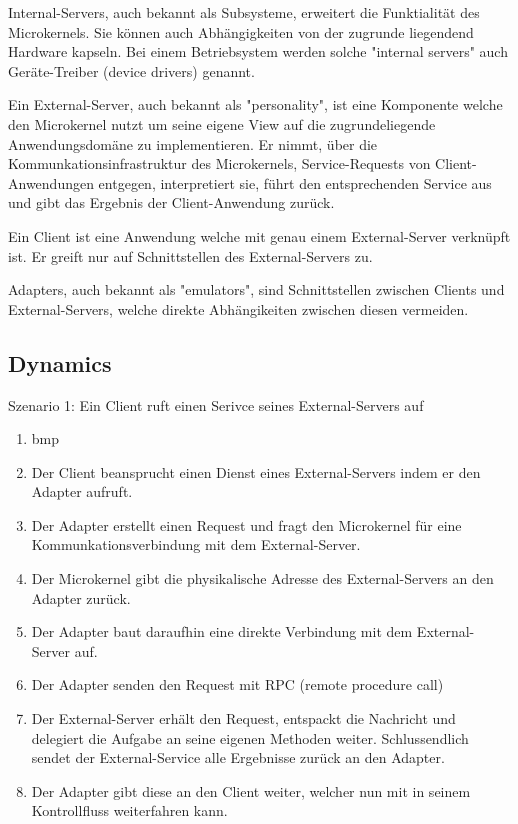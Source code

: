 Internal-Servers, auch bekannt als Subsysteme, erweitert die Funktialität des Microkernels. Sie können auch Abhängigkeiten von der zugrunde liegendend Hardware kapseln. Bei einem Betriebsystem werden solche "internal servers" auch Geräte-Treiber (device drivers) genannt.

Ein External-Server, auch bekannt als "personality", ist eine Komponente welche den Microkernel nutzt um seine eigene View auf die zugrundeliegende Anwendungsdomäne zu implementieren. Er nimmt, über die Kommunkationsinfrastruktur des Microkernels, Service-Requests von Client-Anwendungen entgegen, interpretiert sie, führt den entsprechenden Service aus und gibt das Ergebnis der Client-Anwendung zurück.

Ein Client ist eine Anwendung welche mit genau einem External-Server verknüpft ist. Er greift nur auf Schnittstellen des External-Servers zu.

Adapters, auch bekannt als "emulators", sind Schnittstellen zwischen Clients und External-Servers, welche direkte Abhängikeiten zwischen diesen vermeiden.

\subsection*{Dynamics}


Szenario 1: Ein Client ruft einen Serivce seines External-Servers auf

\begin{enumerate}
	\item bmp
	\item Der Client beansprucht einen Dienst eines External-Servers indem er den Adapter aufruft.
	\item Der Adapter erstellt einen Request und fragt den Microkernel für eine Kommunkationsverbindung mit dem External-Server.
	\item Der Microkernel gibt die physikalische Adresse des External-Servers an den Adapter zurück.
	\item Der Adapter baut daraufhin eine direkte Verbindung mit dem External-Server auf.
	\item Der Adapter senden den Request mit RPC (remote procedure call)
	\item Der External-Server erhält den Request, entspackt die Nachricht und delegiert die Aufgabe an seine eigenen Methoden weiter. Schlussendlich sendet der External-Service alle Ergebnisse zurück an den Adapter.
	\item Der Adapter gibt diese an den Client weiter, welcher nun mit in seinem Kontrollfluss weiterfahren kann.
\end{enumerate}


